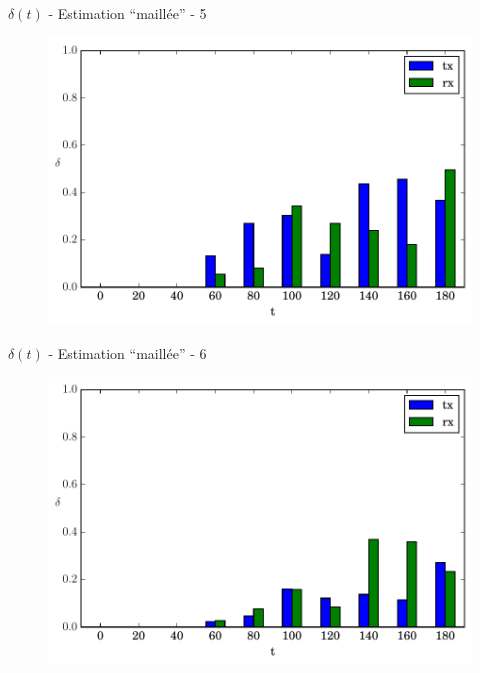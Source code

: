 \begin{frame}{$\delta(t)$ - Estimation ``maillée'' - 5}
  \begin{figure}
    \centering  
    \includegraphics[width=\textwidth]{figures/evolution_route_5.pdf}
  \end{figure}
\end{frame}

\begin{frame}{$\delta(t)$ - Estimation ``maillée'' - 6}
  \begin{figure}
    \centering  
    \includegraphics[width=\textwidth]{figures/evolution_route_6.pdf}
  \end{figure}
\end{frame}


